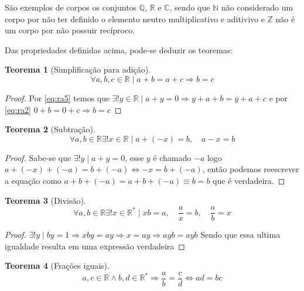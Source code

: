 \documentclass[
]{book}
\newtheorem{theorem}{Teorema}[chapter]
\theoremstyle{definition}
\theoremstyle{definition}
\theoremstyle{definition}
\theoremstyle{definition}
\theoremstyle{remark}
\begin{document}
São exemplos de corpos os conjuntos \(\mathbb{Q}\), \(\mathbb{R}\) e \(\mathbb{C}\), sendo que \(\mathbb{N}\) não considerado um corpo por não ter definido o elemento neutro multiplicativo e aditivivo e \(\mathbb{Z}\) não é um corpo por não possuir recíproco.

Das propriedades definidas acima, pode-se deduzir os teoremas:

\begin{theorem}[Simplificação para adição]
\protect\hypertarget{thm:thmsimpladd}{}\label{thm:thmsimpladd}\[
\forall a,b,c \in \mathbb{R} \mid a+b=a+c \Rightarrow b = c
\]
\end{theorem}

\begin{proof}
Por \eqref{eq:ra5} temos que \(\exists! y \in \mathbb{R} \mid a+y = 0 \Rightarrow y+a+b=y+a+c\) e por \eqref{eq:ra2} \(0+b = 0+c \Rightarrow b = c\)
\end{proof}

\begin{theorem}[Subtração]
\protect\hypertarget{thm:thmsubtr}{}\label{thm:thmsubtr}\[
\forall a,b \in \mathbb{R} \exists! x \in \mathbb{R} \mid a + (-x) = b, \quad a-x=b 
\]
\end{theorem}

\begin{proof}
Sabe-se que \(\exists!y \mid a+y = 0\), esse \(y\) é chamado \(-a\) logo \(a+(-x)+(-a)=b+(-a) \Leftrightarrow -x = b + (-a)\), então podemos reescrever a equação como \(a + b + (-a) = a + b + (-a) \equiv b = b\) que é verdadeira.
\end{proof}

\begin{theorem}[Divisão]
\protect\hypertarget{thm:thmdiv}{}\label{thm:thmdiv}\[
\forall a,b \in \mathbb{R} \exists! x \in \mathbb{R}^* \mid xb = a, \quad \frac{a}{x}=b, \quad \frac{a}{b} = x 
\]
\end{theorem}

\begin{proof}
\(\exists!y\mid by=1 \Rightarrow xby=ay \Rightarrow x = ay \Rightarrow ayb = ayb\) Sendo que essa ultima igualdade resulta em uma expressão verdadeira
\end{proof}

\begin{theorem}[Frações iguais]
\protect\hypertarget{thm:thmfrceq}{}\label{thm:thmfrceq}\[
a,c \in \mathbb{R} \wedge b,d \in \mathbb{R}^* 
\Rightarrow
\frac{a}{b} = \frac{c}{d} \Leftrightarrow ad = bc 
\]
\end{theorem}
\end{document}
